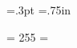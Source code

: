 %
\def\gloggingall{\begingroup \globaldefs = 1 \loggingall \endgroup}%
\def\loggingall{\tracingcommands2 \tracingstats2
   \tracingpages1 \tracingoutput1 \tracinglostchars1
   \tracingmacros2 \tracingparagraphs1 \tracingrestores1
   \showboxbreadth\maxdimen\showboxdepth\maxdimen
}%

% 
\newif\ifcropmarks
\let\cropmarks = \cropmarkstrue
%
%
\newdimen\outerhsize \newdimen\outervsize %
\newdimen\cornerlong  \cornerlong=1pc
\newdimen\cornerthick \cornerthick=.3pt
\newdimen\topandbottommargin \topandbottommargin=.75in

\chardef\PAGE = 255
\output = {\onepageout{\pagecontents\PAGE}}

\newbox\headlinebox
\newbox\footlinebox

